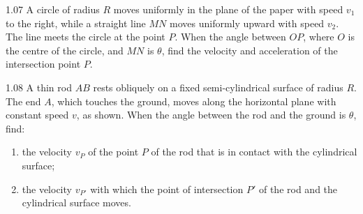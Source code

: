 \begin{problem}{1.07}
A circle of radius $R$ moves uniformly in the plane of the paper with speed $v_1$ to the right, while a straight line $MN$ moves uniformly upward with speed $v_2$. The line meets the circle at the point $P$. When the angle between $OP$, where $O$ is the centre of the circle, and $MN$ is $\theta$, find the velocity and acceleration of the intersection point $P$.
\end{problem}

\begin{problem}{1.08}
A thin rod $AB$ rests obliquely on a fixed semi-cylindrical surface of radius $R$. The end $A$, which touches the ground, moves along the horizontal plane with constant speed $v$, as shown. When the angle between the rod and the ground is $\theta$, find:
\begin{enumerate}[label=(\arabic*),leftmargin=2.2em,itemsep=1pt,topsep=2pt]
\item the velocity $v_P$ of the point $P$ of the rod that is in contact with the cylindrical surface;
\item the velocity $v_{P'}$ with which the point of intersection $P'$ of the rod and the cylindrical surface moves.
\end{enumerate}
\end{problem}

